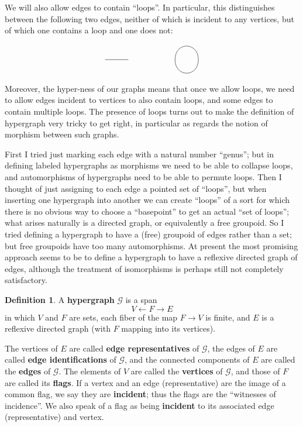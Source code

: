 \documentclass{article}
\theoremstyle{definition}
\newtheorem{defn}[thm]{Definition}
\theoremstyle{remark}
\def\G{\mathcal{G}}
\let\ot\leftarrow
\begin{document}
We will also allow edges to contain ``loops''.
In particular, this distinguishes between the following two edges, neither of which is incident to any vertices, but of which one contains a loop and one does not:
\[
\begin{tikzpicture}
  \draw (0,0) -- (1,0);
  \draw (3,0) to[out=90,in=90,looseness=2] (4,0) to[out=-90,in=-90,looseness=2] (3,0);
\end{tikzpicture}
\]
Moreover, the hyper-ness of our graphs means that once we allow loops, we need to allow edges incident to vertices to also contain loops, and some edges to contain multiple loops.
The presence of loops turns out to make the definition of hypergraph very tricky to get right, in particular as regards the notion of morphism between such graphs.

First I tried just marking each edge with a natural number ``genus''; but in defining labeled hypergraphs as morphisms we need to be able to collapse loops, and automorphisms of hypergraphs need to be able to permute loops.
Then I thought of just assigning to each edge a pointed set of ``loops'', but when inserting one hypergraph into another we can create ``loops'' of a sort for which there is no obvious way to choose a ``basepoint'' to get an actual ``set of loops''; what arises naturally is a directed graph, or equivalently a free groupoid.
So I tried defining a hypergraph to have a (free) groupoid of edges rather than a set; but free groupoids have too many automorphisms.
At present the most promising approach seems to be to define a hypergraph to have a reflexive directed graph of edges, although the treatment of isomorphisms is perhaps still not completely satisfactory.

\begin{defn}
  A \textbf{hypergraph} $\G$ is a span
  \[ V \ot F \to E \]
  in which $V$ and $F$ are sets, each fiber of the map $F\to V$ is finite, and $E$ is a reflexive directed graph (with $F$ mapping into its vertices).

  The vertices of $E$ are called \textbf{edge representatives} of $\G$, the edges of $E$ are called \textbf{edge identifications} of $\G$, and the connected components of $E$ are called the \textbf{edges} of $\G$.
  The elements of $V$ are called the \textbf{vertices} of $\G$, and those of $F$ are called its \textbf{flags}.
  If a vertex and an edge (representative) are the image of a common flag, we say they are \textbf{incident}; thus the flags are the ``witnesses of incidence''.
  We also speak of a flag as being \textbf{incident} to its associated edge (representative) and vertex.
\end{defn}
\end{document}
